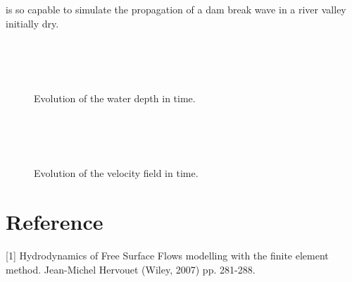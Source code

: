 \bigskip
{} is so capable to simulate the propagation of a dam break wave 
in a river valley initially dry.
%
\begin{figure}[H]
 \begin{center}
 \\
 \\
 \\
  \end{center}
 \caption{Evolution of the water depth in time.}
 \label{t2d:malpasset:fig:depth}
\end{figure}
\begin{figure}[H]
 \begin{center}
 \\
 \\
 \\
 \end{center}
 \caption{Evolution of the velocity field in time.}
 \label{t2d:malpasset:fig:velo}
\end{figure}
%
\section{Reference}
%
[1] Hydrodynamics of Free Surface Flows modelling with the finite
element method. Jean-Michel Hervouet (Wiley, 2007) pp. 281-288.
%
%